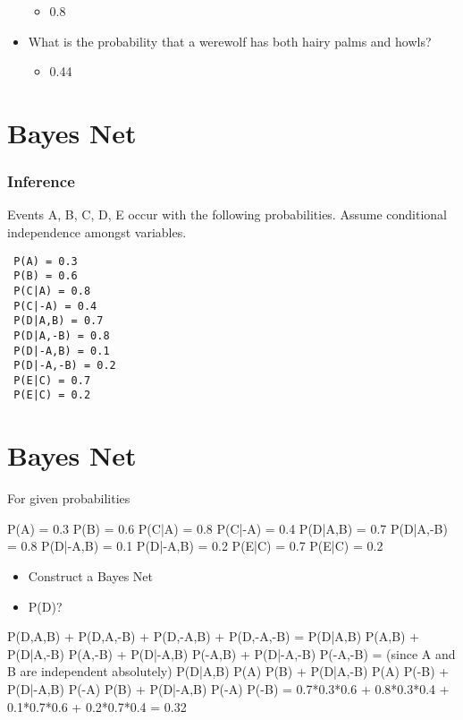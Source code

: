 \documentclass[compress, 9pt]{beamer}
\begin{document}
\begin{frame}
\begin{itemize}
\begin{itemize}
\item <8-> 0.8
\label{sec-2-2-5-1}%
\end{itemize} %

\item <8-> What is the probability that a werewolf has both hairy palms and howls?
\label{sec-2-2-6}%
\begin{itemize}

\item <9-> 0.44
\label{sec-2-2-6-1}%

\end{itemize} %
\end{itemize} %
\end{frame}
\section{Bayes Net}
\label{sec-3}
\begin{frame}[fragile]
\frametitle{Inference}
\label{sec-3-1}

Events A, B, C, D, E occur with the following probabilities. Assume
conditional independence amongst variables.

\begin{verbatim}
 P(A) = 0.3
 P(B) = 0.6
 P(C|A) = 0.8
 P(C|-A) = 0.4
 P(D|A,B) = 0.7
 P(D|A,-B) = 0.8
 P(D|-A,B) = 0.1
 P(D|-A,-B) = 0.2
 P(E|C) = 0.7
 P(E|C) = 0.2
\end{verbatim}
\end{frame}
\section{Bayes Net}
\label{sec-4}

For given probabilities

P(A) = 0.3
P(B) = 0.6
P(C|A) = 0.8
P(C|-A) = 0.4
P(D|A,B) = 0.7 
P(D|A,-B) = 0.8 
P(D|-A,B) = 0.1 
P(D|-A,B) = 0.2 
P(E|C) = 0.7 
P(E|C) = 0.2

\begin{itemize}
\item Construct a Bayes Net
\end{itemize}


\begin{itemize}
\item P(D)?
\end{itemize}

P(D,A,B) + P(D,A,-B) + P(D,-A,B) + P(D,-A,-B) =
P(D|A,B) P(A,B) + P(D|A,-B) P(A,-B) + 
P(D|-A,B) P(-A,B) + P(D|-A,-B) P(-A,-B) = 
(since A and B are independent absolutely)
P(D|A,B) P(A) P(B) + P(D|A,-B) P(A) P(-B) + 
P(D|-A,B) P(-A) P(B) + P(D|-A,B) P(-A) P(-B) =
0.7*0.3*0.6 + 0.8*0.3*0.4 + 0.1*0.7*0.6 + 0.2*0.7*0.4 = 0.32
\end{document}
